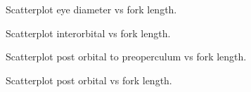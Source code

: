 \documentclass[12pt]{article}\usepackage[]{graphicx}\usepackage[]{color}
\begin{document}
\begin{figure}[htb]

{\centering {} 

}

\caption{Scatterplot eye diameter vs fork length.}\label{fig:figure7}
\end{figure}

\begin{figure}[htb]

{\centering {} 

}

\caption{Scatterplot interorbital vs fork length.}\label{fig:figure8}
\end{figure}

\begin{figure}[htb]

{\centering {} 

}

\caption{Scatterplot post orbital to preoperculum vs fork length.}\label{fig:figure9}
\end{figure}

\begin{figure}[htb]

{\centering {} 

}

\caption{Scatterplot post orbital vs fork length.}\label{fig:figure10}
\end{figure}
\end{document}
